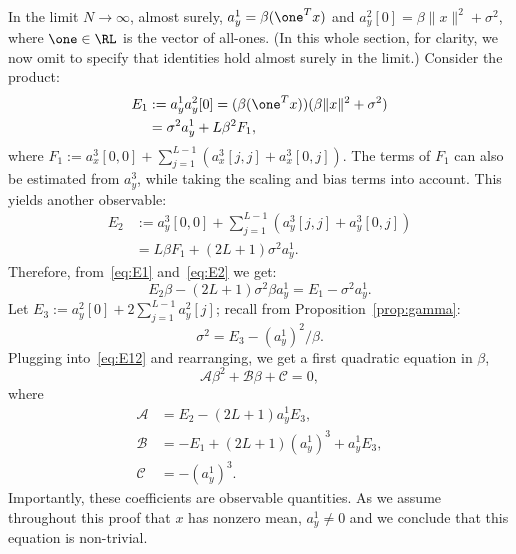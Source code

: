 \documentclass[9pt,twocolumn,twoside,lineno]{pnas-new}
\begin{document}
In the limit $N \to \infty$, almost surely, $a_y^1 = \beta(\one^Tx)$ and $a_y^2[0] = \beta\|x\|^2+\sigma^2$, where $\one\in\RL$ is the vector of all-ones. (In this whole section, for clarity, we now omit to specify that identities hold almost surely in the limit.) Consider the product:
\begin{equation}\label{eq:E1}
\begin{split}
E_1 &:= a_y^1a_y^2[0] =  (\beta(\one^Tx))(\beta\|x\|^2+\sigma^2) \\
& = \sigma^2a_y^1 + L\beta^2F_1,
\end{split}
\end{equation}
where $F_1 := a_x^3[0,0] + \sum_{j=1}^{L-1}(a_x^3[j,j] + a_x^3[0,j])$. 
The terms of $F_1$ can also be estimated from $a_y^3$, while taking the scaling and bias terms into account. This yields another observable:
\begin{align} 
E_2 & := a_y^3[0,0] + \sum_{j=1}^{L-1}(a_y^3[j,j] + a_y^3[0,j]) \nonumber\\
	& = L\beta F_1 + (2L+1)\sigma^2a_y^1. \label{eq:E2}
\end{align}
Therefore, from~\eqref{eq:E1} and~\eqref{eq:E2} we get:
\begin{equation} \label{eq:E12}
E_2\beta -(2L+1)\sigma^2\beta a_y^1 = E_1-\sigma^2a_y^1.
\end{equation}
Let $E_3:=a_y^2[0] + 2\sum_{j = 1}^{L-1}a_y^2[j]$; recall from Proposition~\ref{prop:gamma}:
\begin{equation} \label{eq:sigma2}
\sigma^2 = E_3 - (a^1_y)^2/\beta. 
\end{equation} 
Plugging into~\eqref{eq:E12} and rearranging, we get a first quadratic equation in $\beta$,
\begin{equation} \label{eq:quad1}
\mathcal{A}\beta^2 + \mathcal{B}\beta + \mathcal{C} = 0,
\end{equation}
where 
\begin{align*}
\mathcal{A} &= E_2 - (2L+1)a_y^1E_3, \\ 
\mathcal{B} &= -E_1 + (2L+1)(a_y^1)^3 + a_y^1E_3  , \\
\mathcal{C} &= -(a_y^1)^3.
\end{align*}
Importantly, these coefficients are observable quantities. As we assume throughout this proof that $x$ has nonzero mean, $a_y^1 \neq 0$ and we conclude that this equation is non-trivial.
\end{document}
